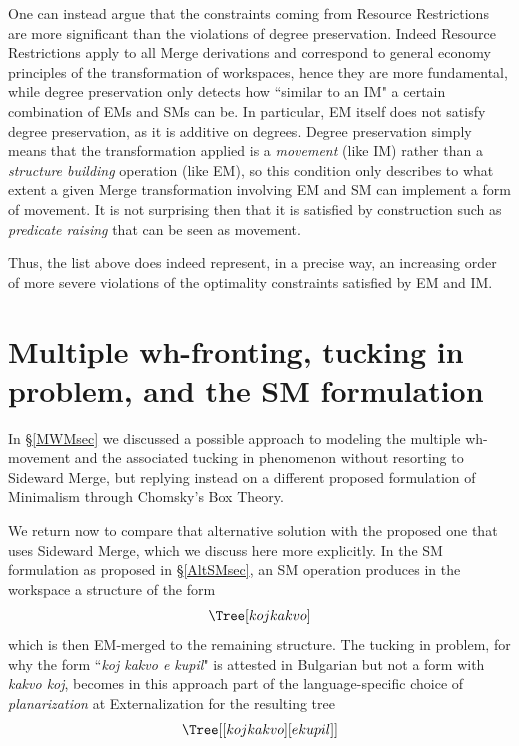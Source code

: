 \documentclass[12pt]{amsart}
\numberwithin{equation}{section}
\begin{document}
One can instead argue that the constraints coming from
Resource Restrictions are more significant than the violations
of degree preservation. Indeed Resource Restrictions apply to
all Merge derivations and correspond to general economy
principles of the transformation of workspaces, hence they
are more fundamental, while degree preservation only
detects how ``similar to an IM" a certain combination of
EMs and SMs can be. In particular, EM itself does not
satisfy degree preservation, as it is additive on degrees.
Degree preservation simply means that the transformation
applied is a {\em movement} (like IM) rather than a {\em structure
building} operation (like EM), so this condition only describes 
to what extent a given Merge transformation involving EM and SM
can implement a form of movement. It is not surprising then
that it is satisfied by construction such as {\em predicate raising}
that can be seen as movement. 

Thus, the list above does indeed represent, in a precise way, an increasing
order of more severe violations of the optimality constraints
satisfied by EM and IM. 

\medskip

\section{Multiple wh-fronting, tucking in problem, and the SM formulation}\label{BulgSMsec}

In \S \ref{MWMsec} we discussed a possible approach to modeling
the multiple wh-movement and the associated tucking in phenomenon
without resorting to Sideward Merge, but replying instead on a different
proposed formulation of Minimalism through Chomsky's Box Theory.

We return now to compare that alternative solution
with the proposed one that uses Sideward Merge, which we
discuss here more explicitly. 
In the SM formulation as proposed in \S \ref{AltSMsec}, 
an SM operation produces in the workspace a structure of the form
$$ \Tree[ koj kakvo ] $$
which is then EM-merged to the remaining structure.
The tucking in problem, for why the form ``{\em koj kakvo e kupil}" 
is attested in Bulgarian but not a form with {\em kakvo koj}, becomes in this
approach part of the language-specific choice of {\em planarization}  
at Externalization for the resulting tree
$$ \Tree[ [ koj kakvo ] [ e kupil ] ] $$
\end{document}
